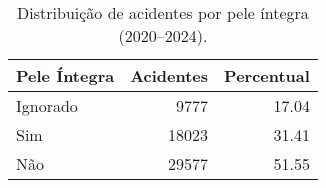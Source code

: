\begin{table}
\caption{Distribuição de acidentes por pele íntegra (2020–2024).}
\begin{tabular}{lrr}
\toprule
Pele Íntegra & Acidentes & Percentual \\
\midrule
Ignorado & 9777 & 17.04 \\
Sim & 18023 & 31.41 \\
Não & 29577 & 51.55 \\
\bottomrule
\end{tabular}
\end{table}
